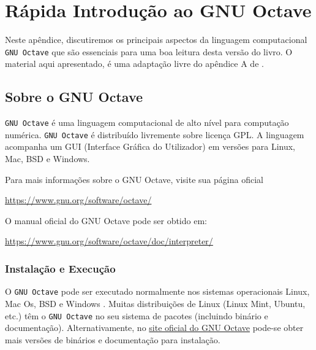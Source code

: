
\chapter{Rápida Introdução ao GNU Octave}\label{cap:octave}

Neste apêndice, discutiremos os principais aspectos da linguagem computacional \verb+GNU Octave+ que são essenciais para uma boa leitura desta versão do livro. O material aqui apresentado, é uma adaptação livre do apêndice A de \cite{CALSCI}.

\section{Sobre o GNU Octave}

\verb+GNU Octave+ é uma linguagem computacional de alto nível para computação numérica. \verb+GNU Octave+ é distribuído livremente sobre licença GPL. A linguagem acompanha um GUI (Interface Gráfica do Utilizador) em versões para Linux, Mac, BSD e Windows. 

Para mais informações sobre o GNU Octave, visite sua página oficial
\begin{center}
  \url{https://www.gnu.org/software/octave/}
\end{center}

O manual oficial do GNU Octave pode ser obtido em:
\begin{center}
  \url{https://www.gnu.org/software/octave/doc/interpreter/}
\end{center}

\subsection{Instalação e Execução}

O \verb+GNU Octave+ pode ser executado normalmente nos sistemas operacionais Linux, Mac Os, BSD e Windows . Muitas distribuições de Linux (Linux Mint, Ubuntu, etc.) têm o \verb+GNU Octave+ no seu sistema de pacotes (incluindo binário e documentação). Alternativamente, no \href{https://www.gnu.org/software/octave/}{site oficial do GNU Octave} pode-se obter mais versões de binários e documentação para instalação.

